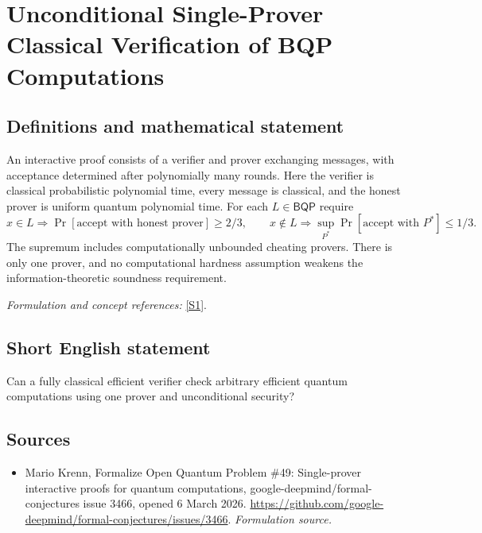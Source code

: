 \documentclass[11pt]{article}
\begin{document}
\section*{\texorpdfstring{Unconditional Single-Prover Classical Verification of BQP Computations}{Unconditional Single-Prover Classical Verification of BQP Computations}}\label{30006741}
\subsection{Definitions and mathematical statement}
An interactive proof consists of a verifier and prover exchanging messages, with acceptance determined after polynomially many rounds. Here the verifier is classical probabilistic polynomial time, every message is classical, and the honest prover is uniform quantum polynomial time. For each $L\in\mathsf{BQP}$ require
\[
 x\in L\Rightarrow\Pr[\text{accept with honest prover}]\ge2/3,\qquad
 x\notin L\Rightarrow\sup_{P^*}\Pr[\text{accept with }P^*]\le1/3.
\]
The supremum includes computationally unbounded cheating provers. There is only one prover, and no computational hardness assumption weakens the information-theoretic soundness requirement.
\par\smallskip\textit{Formulation and concept references:} \href{https://github.com/google-deepmind/formal-conjectures/issues/3466}{[S1]}.

\subsection{Short English statement}
Can a fully classical efficient verifier check arbitrary efficient quantum computations using one prover and unconditional security?
\subsection{Sources}
\begin{itemize}
\item[S1]Mario Krenn, Formalize Open Quantum Problem \#49: Single-prover interactive proofs for quantum computations, google-deepmind/formal-conjectures issue 3466, opened 6 March 2026.
\url{https://github.com/google-deepmind/formal-conjectures/issues/3466}.
\textit{Formulation source.}
\end{itemize}
\end{document}
